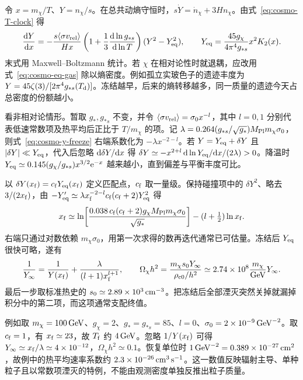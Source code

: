 令 $x=m_\chi/T$、$Y=n_\chi/s$。在总共动熵守恒时，$s\dot Y=\dot n_\chi+3Hn_\chi$。由式~\eqref{eq:cosmo-T-clock} 得
\begin{equation}\label{eq:cosmo-y-freeze}
 \frac{\dd Y}{\dd x}=
 -\frac{s\langle\sigma v_{\rm rel}\rangle}{Hx}
 \left(1+\frac13\frac{\dd\ln g_{*s}}{\dd\ln T}\right)(Y^2-Y_{\rm eq}^2),
 \qquad
 Y_{\rm eq}=\frac{45g_\chi}{4\pi^4 g_{*s}}x^2 K_2(x).
\end{equation}
末式用 Maxwell--Boltzmann 统计。若 $\chi$ 在相对论性时就退耦，应改用式~\eqref{eq:cosmo-eq-gas} 除以熵密度。例如孤立实玻色子的遗迹丰度为 $Y=45\zeta(3)/[2\pi^4g_{*s}(T_{\rm d})]$。冻结越早，后来的熵转移越多，同一质量的遗迹今天占总密度的份额越小。

看非相对论情形。暂取 $g_*,g_{*s}$ 不变，并令 $\langle\sigma v_{\rm rel}\rangle=\sigma_0 x^{-l}$，其中 $l=0,1$ 分别代表低速常数项及热平均后正比于 $T/m_\chi$ 的项。记 $\lambda=0.264(g_{*s}/\sqrt{g_*})M_{\rm Pl}m_\chi\sigma_0$，则式~\eqref{eq:cosmo-y-freeze} 右端系数化为 $-\lambda x^{-2-l}$。若 $Y=Y_{\rm eq}+\delta Y$ 且 $|\delta Y|\ll Y_{\rm eq}$，代入后忽略 $\dd\delta Y/\dd x$ 得 $\delta Y\simeq-x^{2+l}\,\dd\ln Y_{\rm eq}/\dd x/(2\lambda)>0$。降温时 $Y_{\rm eq}\simeq0.145(g_\chi/g_{*s})x^{3/2}\mathrm{e}^{-x}$ 越来越小，直到偏差与平衡丰度可比。

以 $\delta Y(x_{\rm f})=c_{\rm f}Y_{\rm eq}(x_{\rm f})$ 定义匹配点，$c_{\rm f}$ 取一量级。保持碰撞项中的 $\delta Y^2$、略去 $3/(2x_{\rm f})$，由 $-Y_{\rm eq}'\simeq\lambda x_{\rm f}^{-2-l}c_{\rm f}(c_{\rm f}+2)Y_{\rm eq}^2$ 得
\[
 x_{\rm f}\simeq\ln\!\left[
 \frac{0.038\,c_{\rm f}(c_{\rm f}+2)g_\chi M_{\rm Pl}m_\chi\sigma_0}{\sqrt{g_*}}
 \right]-(l+\tfrac12)\ln x_{\rm f}.
\]
右端只通过对数依赖 $m_\chi\sigma_0$，用第一次求得的数再迭代通常已可估量。冻结后 $Y_{\rm eq}$ 很快可略，遂有
\[
 \frac{1}{Y_\infty}=\frac{1}{Y(x_{\rm f})}
 +\frac{\lambda}{(l+1)x_{\rm f}^{l+1}},
 \qquad
 \Omega_\chi h^2=\frac{m_\chi s_0Y_\infty}{\rho_{{\rm c}0}/h^2}
 \simeq2.74\times10^8\frac{m_\chi}{{\rm GeV}}Y_\infty .
\]
最后一步取标准热史的 $s_0\simeq2.89\times10^3\,{\rm cm}^{-3}$。把冻结后全部湮灭突然关掉就漏掉积分中的第二项，而这项通常支配终值。

例如取 $m_\chi=100\,{\rm GeV}$、$g_\chi=2$、$g_*=g_{*s}=85$、$l=0$、$\sigma_0=2\times10^{-9}\,{\rm GeV}^{-2}$。取 $c_{\rm f}=1$，有 $x_{\rm f}\simeq23$，故 $T_{\rm f}$ 约 $4\,{\rm GeV}$。忽略 $1/Y(x_{\rm f})$ 可得 $Y_\infty\simeq x_{\rm f}/\lambda\simeq4\times10^{-12}$，$\Omega_\chi h^2\simeq0.1$。恢复单位时 $1\,{\rm GeV}^{-2}=0.389\times10^{-27}\,{\rm cm}^2$，故例中的热平均速率系数约 $2.3\times10^{-26}\,{\rm cm}^3\,{\rm s}^{-1}$。这一数值反映辐射主导、单种粒子且以常数项湮灭的特例，不能由观测密度单独反推出粒子质量。

